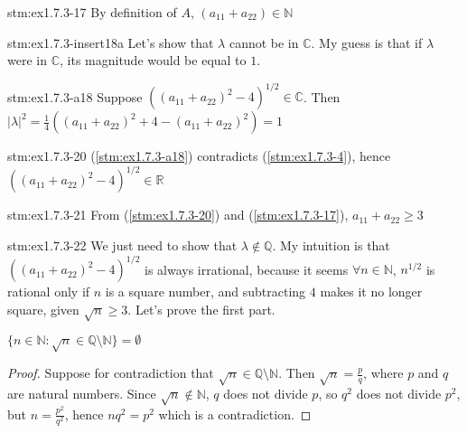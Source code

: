 \begin{statement}{stm:ex1.7.3-17}
By definition of $A$, $(a_{11} + a_{22}) \in \mathbb{N}$
\end{statement}

\begin{explanation}{stm:ex1.7.3-insert18a}
Let's show that $\lambda$ cannot be in $\mathbb{C}$. My guess is that if $\lambda$ were in $\mathbb{C}$, its magnitude would be equal to $1$.
\end{explanation}

\begin{statement}{stm:ex1.7.3-a18}
Suppose $((a_{11} + a_{22})^2 - 4)^{1/2} \in \mathbb{C}$. Then $|\lambda|^2 = \frac{1}{4}((a_{11} + a_{22})^2 + 4 - (a_{11} + a_{22})^2) = 1$
\end{statement}

\begin{statement}{stm:ex1.7.3-20}
(\ref{stm:ex1.7.3-a18}) contradicts (\ref{stm:ex1.7.3-4}), hence $((a_{11} + a_{22})^2 - 4)^{1/2} \in \mathbb{R}$
\end{statement}

\begin{statement}{stm:ex1.7.3-21}
From (\ref{stm:ex1.7.3-20}) and (\ref{stm:ex1.7.3-17}), $a_{11} + a_{22} \geq 3$
\end{statement}

\begin{explanation}{stm:ex1.7.3-22}
We just need to show that $\lambda \notin \mathbb{Q}$. My intuition is that $((a_{11} + a_{22})^2 - 4)^{1/2}$ is always irrational, because it seems $\forall n \in \mathbb{N}$, $n^{1/2}$ is rational only if $n$ is a square number, and subtracting $4$ makes it no longer square, given $\sqrt{n} \ge 3$. Let's prove the first part.
\end{explanation}

\begin{conj}\label{stm:ex1.7.3-c23}
$\{n \in \mathbb{N} : \sqrt{n} \in \mathbb{Q} \setminus \mathbb{N} \} = \emptyset$
\end{conj}

\begin{proof}
Suppose for contradiction that $\sqrt{n} \in \mathbb{Q} \setminus \mathbb{N}$. Then $\sqrt{n} = \frac{p}{q}$, where $p$ and $q$ are natural numbers. Since $\sqrt{n} \notin \mathbb{N}$, $q$ does not divide $p$, so $q^2$ does not divide $p^2$, but $n = \frac{p^2}{q^2}$, hence $n q^2 = p^2$ which is a contradiction.
\end{proof}

